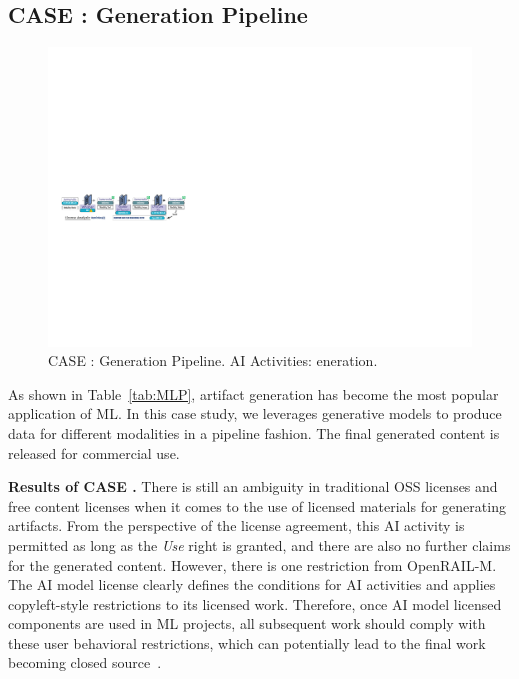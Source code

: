 \subsection{CASE  : Generation Pipeline}

\begin{figure}[h]
    \centering
    \includegraphics[width=\linewidth]{fig/case3.pdf}
    \caption{CASE : Generation Pipeline. AI Activities: eneration.}
    \Description{}
    \label{fig:case3}
\end{figure}

As shown in Table~\ref{tab:MLP}, artifact generation has become the most popular application of ML.
In this case study, we leverages generative models to produce data for different modalities in a pipeline fashion.
The final generated content is released for commercial use.

\textbf{Results of CASE .}
There is still an ambiguity in traditional OSS licenses and free content licenses when it comes to the use of licensed materials for generating artifacts.
From the perspective of the license agreement, this AI activity is permitted as long as the \textit{Use} right is granted, and there are also no further claims for the generated content.
However, there is one restriction from OpenRAIL-M. 
The AI model license clearly defines the conditions for AI activities and applies copyleft-style restrictions to its licensed work. 
Therefore, once AI model licensed components are used in ML projects, all subsequent work should comply with these user behavioral restrictions, which can potentially lead to the final work becoming closed source~\cite{greenbaum2016the}.

